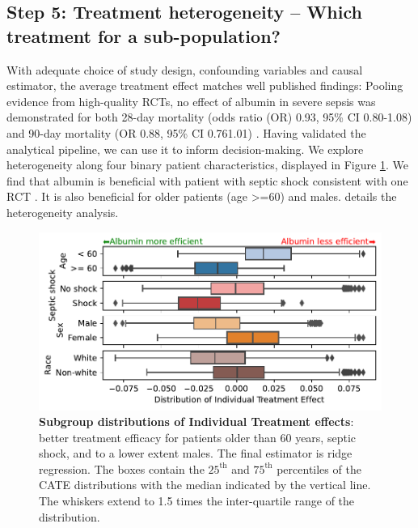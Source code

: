 \documentclass[10pt,letterpaper]{article}
\begin{document}
\subsection*{Step 5: Treatment heterogeneity -- Which treatment for a sub-population?}%
\label{sec:treamtent_heterogeneity_mimic_iv}


With adequate choice of study design, confounding variables and causal
estimator, the average treatment effect matches well published findings:
Pooling evidence from high-quality RCTs, no effect of albumin in severe
sepsis was demonstrated for both 28-day mortality (odds ratio (OR) 0.93,
95\% CI 0.80-1.08) and 90-day mortality (OR 0.88, 95\% CI 0.761.01)
\cite{xu2014comparison}.
%
Having validated the analytical pipeline, we can use it to inform
decision-making. We explore
heterogeneity along four binary patient characteristics, displayed in Figure
\ref{fig:albumin_for_sepsis:cate_results}. We find that albumin is beneficial
with patient with septic shock consistent with one
RCT  \cite{caironi2014albumin}. It is also beneficial for older patients (age >=60) and males.  details the heterogeneity analysis.

\begin{figure}[h!]
  \begin{minipage}{.4\linewidth}
    \caption{\textbf{Subgroup distributions of Individual Treatment
        effects}:
      better treatment efficacy for patients older than 60 years, septic shock,
      and to a lower extent males. The final estimator is ridge regression. The
      boxes contain the $25^\text{th}$ and $75^\text{th}$ percentiles of the CATE
      distributions with the median indicated by the vertical line. The whiskers
      extend to 1.5 times the inter-quartile range of the
      distribution.}\label{fig:albumin_for_sepsis:cate_results}
  \end{minipage}%
  \hfill%
  \begin{minipage}{.6\linewidth}
    \includegraphics[width=\linewidth]{img_main/boxplot_est__DML__nuisances__Forests__final_Ridge.pdf}
  \end{minipage}%
\end{figure}
\end{document}
